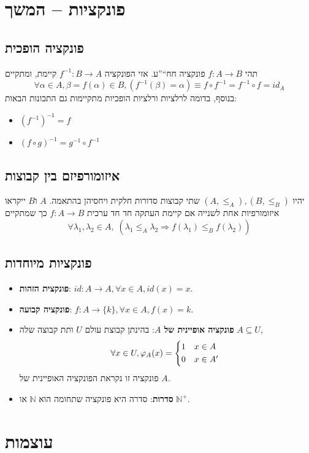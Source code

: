 \documentclass[11pt, oneside]{article}
\newcommand{\opr}[1]{\underset{\text{#1}}{\Rightarrow}}
\newcommand{\mN}{\mathbb{N}}
\newcommand{\inv}[1]{#1^{-1}}
\newcommand{\definition}[2]{\textbf{#1}: #2.}
\begin{document}
\clearpage
\section*{פונקציות -- המשך}
\subsection*{פונקציה הופכית}
תהי $f: A \to B$ פונקציה חח``''ע. אזי הפונקציה $\inv{f}: B \to A$ קיימת, ומתקיים
\[
\forall \alpha \in A, \beta = f(\alpha) \in B, (\inv{f}(\beta) = \alpha) \equiv f \circ \inv{f} = \inv{f} \circ f = id_{A}
\]
בנוסף, בדומה לרלציות ורלציות הופכיות מתקיימות גם התכונות הבאות:
\begin{itemize}
\item $\inv{(\inv{f})} = f$
\item $\inv{(f \circ g)} = \inv{g} \circ \inv{f}$
\end{itemize}

\subsection*{איזומורפיזם בין קבוצות}
יהיו $(A, \le_{A}), (B, \le_{B})$ שתי קבוצות סדורות חלקית ויחסיהן בהתאמה. $A$ ו$B$ ייקראו איזומורפיות אחת לשנייה אם קיימת העתקה חד חד ערכית $f: A \to B$ כך שמתקיים
\[
\forall \lambda_{1}, \lambda_{2} \in A,\;(\lambda_{1} \le_{A} \lambda_{2} \opr{} f(\lambda_{1}) \le_{B} f(\lambda_{2}))
\]

\subsection*{פונקציות מיוחדות}
\begin{itemize}
\item \definition{פונקצית הזהות}{$id: A \to A, \forall x \in A, id(x) = x$}
\item \definition{פונקציה קבועה}{$f: A \to \{k\}, \forall x \in A, f(x) = k$}
\item \definition{פונקציה אופיינית של $A$}{בהינתן קבוצת עולם $U$ ותת קבוצה שלה $A \subseteq U$,
\[
\forall x \in U, \varphi_{A}(x) = \begin{cases*}
1 & $x \in A$\\
0 & $x \in A'$
\end{cases*}
\]
פונקציה זו נקראת הפונקציה האופיינית של $A$}
\item \definition{סדרות}{סדרה היא פונקציה שתחומה הוא $\mN$ או $\mN^{+}$}
\end{itemize}

\clearpage
\section*{עוצמות}
\end{document}
